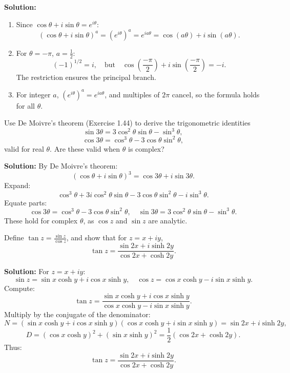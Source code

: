 \textbf{Solution:}
\begin{enumerate}[label=\roman*)]
\item Since \( \cos \theta + i \sin \theta = e^{i\theta} \):
\[
(\cos \theta + i \sin \theta)^a = (e^{i\theta})^a = e^{i a \theta} = \cos(a\theta) + i \sin(a\theta).
\]
\item For \( \theta = -\pi \), \( a = \frac{1}{2} \):
\[
(-1)^{1/2} = i, \quad \text{but} \quad \cos\left(\frac{-\pi}{2}\right) + i \sin\left(\frac{-\pi}{2}\right) = -i.
\]
The restriction ensures the principal branch.
\item For integer \( a \), \( (e^{i\theta})^a = e^{i a \theta} \), and multiples of \( 2\pi \) cancel, so the formula holds for all \( \theta \).
\end{enumerate}

\begin{problembox}
Use De Moivre's theorem (Exercise 1.44) to derive the trigonometric identities
\[
\sin 3\theta = 3 \cos^2 \theta \sin \theta - \sin^3 \theta,
\]
\[
\cos 3\theta = \cos^3 \theta - 3 \cos \theta \sin^2 \theta,
\]
valid for real \( \theta \). Are these valid when \( \theta \) is complex?
\end{problembox}

\textbf{Solution:}
By De Moivre's theorem:
\[
(\cos \theta + i \sin \theta)^3 = \cos 3\theta + i \sin 3\theta.
\]
Expand:
\[
\cos^3 \theta + 3i \cos^2 \theta \sin \theta - 3 \cos \theta \sin^2 \theta - i \sin^3 \theta.
\]
Equate parts:
\[
\cos 3\theta = \cos^3 \theta - 3 \cos \theta \sin^2 \theta, \quad \sin 3\theta = 3 \cos^2 \theta \sin \theta - \sin^3 \theta.
\]
These hold for complex \( \theta \), as \( \cos z \) and \( \sin z \) are analytic.

\begin{problembox}
Define \( \tan z = \frac{\sin z}{\cos z} \), and show that for \( z = x + iy \),
\[
\tan z = \frac{\sin 2x + i \sinh 2y}{\cos 2x + \cosh 2y}.
\]
\end{problembox}

\textbf{Solution:}
For \( z = x + iy \):
\[
\sin z = \sin x \cosh y + i \cos x \sinh y, \quad \cos z = \cos x \cosh y - i \sin x \sinh y.
\]
Compute:
\[
\tan z = \frac{\sin x \cosh y + i \cos x \sinh y}{\cos x \cosh y - i \sin x \sinh y}.
\]
Multiply by the conjugate of the denominator:
\[
N = (\sin x \cosh y + i \cos x \sinh y)(\cos x \cosh y + i \sin x \sinh y) = \sin 2x + i \sinh 2y,
\]
\[
D = (\cos x \cosh y)^2 + (\sin x \sinh y)^2 = \frac{1}{2}(\cos 2x + \cosh 2y).
\]
Thus:
\[
\tan z = \frac{\sin 2x + i \sinh 2y}{\cos 2x + \cosh 2y}.
\]

